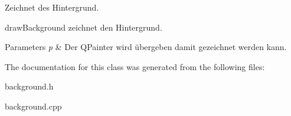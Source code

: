 Zeichnet des Hintergrund. 

draw\+Background zeichnet den Hintergrund. 
\begin{DoxyParams}{Parameters}
{\em p} & Der Q\+Painter wird übergeben damit gezeichnet werden kann. \\
\hline
\end{DoxyParams}


The documentation for this class was generated from the following files\+:\begin{DoxyCompactItemize}
\item 
background.\+h\item 
background.\+cpp\end{DoxyCompactItemize}
